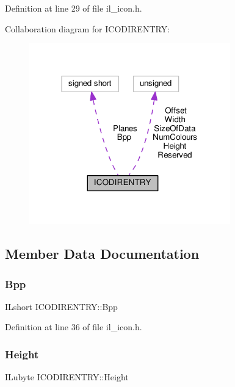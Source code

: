 Definition at line 29 of file il\+\_\+icon.\+h.



Collaboration diagram for I\+C\+O\+D\+I\+R\+E\+N\+T\+RY\+:
\nopagebreak
\begin{figure}[H]
\begin{center}
\leavevmode
\includegraphics[width=247pt]{dd/d2b/structICODIRENTRY__coll__graph}
\end{center}
\end{figure}


\subsection{Member Data Documentation}
\mbox{\label{structICODIRENTRY_ab3d8137c20c93f2e9f293d3cbe38ffb1}} 
\subsubsection{\texorpdfstring{Bpp}{Bpp}}
{\footnotesize\ttfamily I\+Lshort I\+C\+O\+D\+I\+R\+E\+N\+T\+R\+Y\+::\+Bpp}



Definition at line 36 of file il\+\_\+icon.\+h.

\mbox{\label{structICODIRENTRY_a76fa67bdd9a8352457a3315e69e603b7}} 
\subsubsection{\texorpdfstring{Height}{Height}}
{\footnotesize\ttfamily I\+Lubyte I\+C\+O\+D\+I\+R\+E\+N\+T\+R\+Y\+::\+Height}



